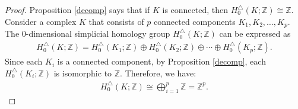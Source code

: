 \begin{proof}
	Proposition \ref{decomp} says that if \( K \) is connected, then \( H^{\triangle}_{0}(K; \mathbb{Z}) \cong \mathbb{Z} \). Consider a complex \( K \) that consists of \( p \) connected components \( K_1, K_2, \ldots, K_p \). The $0$-dimensional simplicial homology group \( H^{\triangle}_{0}(K; \mathbb{Z}) \) can be expressed as
	\begin{align}
		H^{\triangle}_{0}(K; \mathbb{Z}) = H^{\triangle}_{0}(K_1; \mathbb{Z}) \oplus H^{\triangle}_{0}(K_2; \mathbb{Z}) \oplus \cdots \oplus H^{\triangle}_{0}(K_p; \mathbb{Z}). 
	\end{align}	
	Since each \( K_i \) is a connected component, by Proposition \ref{decomp}, each \( H^{\triangle}_{0}(K_i; \mathbb{Z}) \) is isomorphic to \( \mathbb{Z} \). Therefore, we have:
	\begin{align}
		H^{\triangle}_{0}(K; \mathbb{Z}) \cong \bigoplus_{i=1}^p \mathbb{Z} = \mathbb{Z}^{p}. 
	\end{align}
\end{proof}

